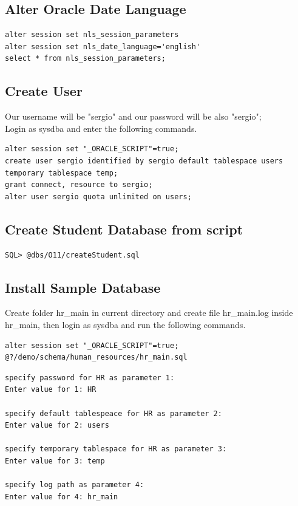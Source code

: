 \documentclass[twoside]{article}
\begin{document}
\subsection{Alter Oracle Date Language}
\begin{verbatim}
alter session set nls_session_parameters
alter session set nls_date_language='english'
select * from nls_session_parameters;
\end{verbatim}

\subsection{Create User}
Our username will be "sergio" and our password will be also "sergio"; \\
Login as sysdba and enter the following commands.
\begin{verbatim}
alter session set "_ORACLE_SCRIPT"=true;
create user sergio identified by sergio default tablespace users temporary tablespace temp;
grant connect, resource to sergio;
alter user sergio quota unlimited on users;
\end{verbatim}

\subsection{Create Student Database from script}
\begin{verbatim}
SQL> @dbs/O11/createStudent.sql
\end{verbatim}

\subsection{Install Sample Database}
Create folder hr\_main in current directory and create file hr\_main.log inside hr\_main, then
login as sysdba and run the following commands.
\begin{verbatim}
alter session set "_ORACLE_SCRIPT"=true;
@?/demo/schema/human_resources/hr_main.sql
\end{verbatim}

\begin{verbatim}
specify password for HR as parameter 1:
Enter value for 1: HR

specify default tablespeace for HR as parameter 2:
Enter value for 2: users

specify temporary tablespace for HR as parameter 3:
Enter value for 3: temp

specify log path as parameter 4:
Enter value for 4: hr_main
\end{verbatim}
\end{document}
